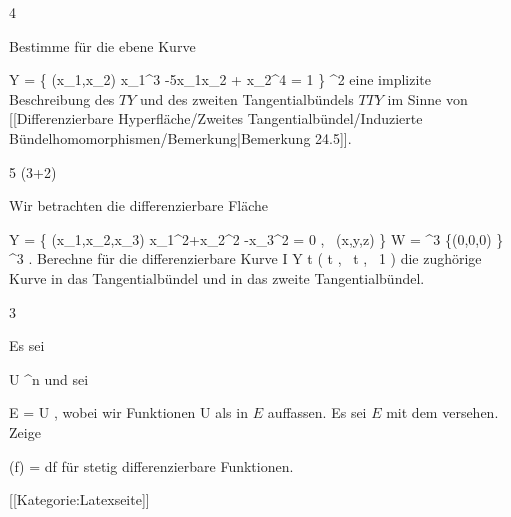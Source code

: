 {4}
{

Bestimme für die ebene Kurve

\mavergleichskettedisp
{\vergleichskette
{ Y
}
{ =} { \left\{ (x_1,x_2)  \mid   x_1^3 -5x_1x_2 + x_2^4 = 1         \right\}
}
{ \subset} { \R^2
}
{ } {
}
{ } {
}
}
{}{}{}
eine implizite Beschreibung des
$TY$ und des zweiten Tangentialbündels $TTY$ im Sinne von
[[Differenzierbare Hyperfläche/Zweites Tangentialbündel/Induzierte Bündelhomomorphismen/Bemerkung|Bemerkung 24.5]].

}
{} {}

{5 (3+2)}
{

Wir betrachten die differenzierbare Fläche

\mavergleichskettedisp
{\vergleichskette
{ Y
}
{ =} { \left\{ (x_1,x_2,x_3)  \mid   x_1^2+x_2^2 -x_3^2 = 0  , \, (x,y,z)        \right\}
}
{ \subseteq} { W
}
{ =} { \R^3 \setminus \{(0,0,0) \}
}
{ \subset} { \R^3
}
}
{}{}{.}
 {Berechne für die differenzierbare Kurve
\maabbeledisp {} { I } { Y
} { t } { \left(  \cos  t   , \,   \sin  t  , \,   1                 \right)
} {}
die zughörige Kurve in das Tangentialbündel und in das zweite Tangentialbündel.
}

}
{} {}

{3}
{

Es sei

\mavergleichskette
{\vergleichskette
{ U
}
{ \subseteq }{ \R^n
}
{  }{
}
{    }{
}
{   }{
}
}
{}{}{}
und sei

\mavergleichskette
{\vergleichskette
{ E
}
{ = }{ U \times \R
}
{  }{
}
{    }{
}
{   }{
}
}
{}{}{,}
wobei wir Funktionen
 { U } {\R
} {}
als
in $E$ auffassen. Es sei $E$ mit dem
versehen. Zeige

\mavergleichskette
{\vergleichskette
{ \nabla (f)
}
{ = }{ df
}
{  }{
}
{    }{
}
{   }{
}
}
{}{}{}
für stetig differenzierbare Funktionen.

}
{} {}

 [[Kategorie:Latexseite]]
